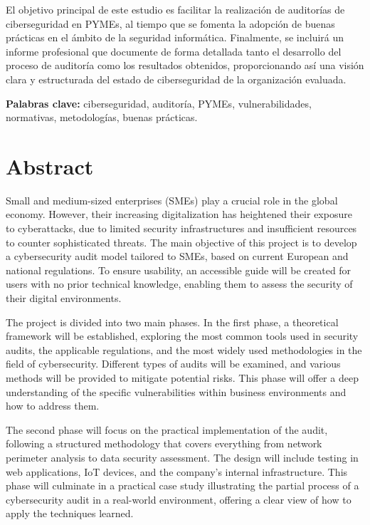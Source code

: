 \documentclass[a4paper, 10pt]{article}
\begin{document}
El objetivo principal de este estudio es facilitar la realización de auditorías de ciberseguridad en PYMEs, al tiempo que se fomenta la adopción de buenas prácticas en el ámbito de la seguridad informática. Finalmente, se incluirá un informe profesional que documente de forma detallada tanto el desarrollo del proceso de auditoría como los resultados obtenidos, proporcionando así una visión clara y estructurada del estado de ciberseguridad de la organización evaluada.

\par\vspace{0.5cm}
\textbf{Palabras clave:} ciberseguridad, auditoría, PYMEs, vulnerabilidades, normativas, metodologías, buenas prácticas.
\clearpage


\section*{Abstract}
\thispagestyle{empty}
Small and medium-sized enterprises (SMEs) play a crucial role in the global economy. However, their increasing digitalization has heightened their exposure to cyberattacks, due to limited security infrastructures and insufficient resources to counter sophisticated threats.
The main objective of this project is to develop a cybersecurity audit model tailored to SMEs, based on current European and national regulations. To ensure usability, an accessible guide will be created for users with no prior technical knowledge, enabling them to assess the security of their digital environments.
\par\vspace{0.5cm}

The project is divided into two main phases. In the first phase, a theoretical framework will be established, exploring the most common tools used in security audits, the applicable regulations, and the most widely used methodologies in the field of cybersecurity. Different types of audits will be examined, and various methods will be provided to mitigate potential risks. This phase will offer a deep understanding of the specific vulnerabilities within business environments and how to address them.
\par\vspace{0.5cm}

The second phase will focus on the practical implementation of the audit, following a structured methodology that covers everything from network perimeter analysis to data security assessment.
The design will include testing in web applications, IoT devices, and the company's internal infrastructure.
This phase will culminate in a practical case study illustrating the partial process of a cybersecurity audit in a real-world environment, offering a clear view of how to apply the techniques learned.
\par\vspace{0.5cm}
\end{document}
